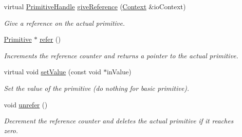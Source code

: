 \begin{DoxyCompactItemize}
virtual \hyperlink{classPuppy_1_1PrimitiveHandle}{Primitive\+Handle} \hyperlink{classPuppy_1_1Primitive_a0319f5a18dd42fe96c77c895948acc2a}{give\+Reference} (\hyperlink{classPuppy_1_1Context}{Context} \&io\+Context)
\begin{DoxyCompactList}\small\item\em Give a reference on the actual primitive. \end{DoxyCompactList}\item 
\hyperlink{classPuppy_1_1Primitive}{Primitive} $\ast$ \hyperlink{classPuppy_1_1Primitive_abc05de8e8a0d2106ae78637a4785a46d}{refer} ()
\begin{DoxyCompactList}\small\item\em Increments the reference counter and returns a pointer to the actual primitive. \end{DoxyCompactList}\item 
virtual void \hyperlink{classPuppy_1_1Primitive_a2cd429caecd22c31166230b3467fb861}{set\+Value} (const void $\ast$in\+Value)
\begin{DoxyCompactList}\small\item\em Set the value of the primitive (do nothing for basic primitive). \end{DoxyCompactList}\item 
\hypertarget{classPuppy_1_1Primitive_aa8d8f10165e9f6d8cfa158be32e00a79}{}void \hyperlink{classPuppy_1_1Primitive_aa8d8f10165e9f6d8cfa158be32e00a79}{unrefer} ()\label{classPuppy_1_1Primitive_aa8d8f10165e9f6d8cfa158be32e00a79}

\begin{DoxyCompactList}\small\item\em Decrement the reference counter and deletes the actual primitive if it reaches zero. \end{DoxyCompactList}\end{DoxyCompactItemize}
